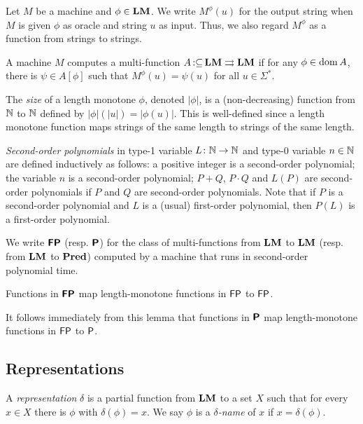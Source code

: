 \documentclass[envcountsame,orivec,oribibl]{llncs}
\newcommand{\pcolon}{\mathpunct{\,:\subseteq}}
\begin{document}
Let $M$ be a machine and $\phi \in \mathbf{LM}$. 
We write $M ^\phi (u)$ for the output string 
when $M$ is given
$\phi$ as oracle and string $u$ as input.
Thus, we also regard $M^\phi$ as a function from strings to strings.

\begin{definition}
 A machine $M$ computes a multi-function $A \pcolon \LM \rightrightarrows \LM$ if for any
 $\phi \in \mathop{\rm dom} A$, there is $\psi \in A[\phi]$ such that $M^\phi(u) = \psi(u)$ for all $u \in \Sigma^*$.
\end{definition}

The \emph{size} of a length monotone $\phi$, denoted $|\phi|$,
is a (non-decreasing) function from $\mathbb N$ to $\mathbb N$ defined by 
$|\phi|(|u|) = |\phi(u)|$.
This is well-defined since a length monotone function maps 
strings of the same length to strings of the same length.

\emph{Second-order polynomials} in type-1 variable $L \colon \mathbb N \to \mathbb N$
and type-0 variable $n \in \mathbb N$ 
are defined inductively as follows:
a positive integer is a second-order polynomial;
the variable $n$ is a second-order polynomial;
$P+Q$, $P \cdot Q$ and $L(P)$ are
second-order polynomials if $P$ and $Q$ are second-order polynomials.
Note that if $P$ is a second-order polynomial and $L$ is a (usual) first-order
polynomial, then $P(L)$ is a first-order polynomial.

\begin{definition}
 We write $\text{\bfseries \sffamily \upshape FP}$ (resp. $\text{\bfseries \sffamily \upshape P}$) for the class of
 multi-functions from $\mathbf{LM}$ to $\mathbf{LM}$ (resp. from $\mathbf{LM}$ to $\mathbf{Pred}$) 
 computed by a machine that runs
 in second-order polynomial time.
\end{definition}

\begin{lemma}
 Functions in $\text{\bfseries \sffamily \upshape FP}$ map 
 length-monotone functions in $\mathsf{FP}$ to $\mathsf{FP}$.
\end{lemma}

It follows immediately from this lemma that functions in $\text{\bfseries \sffamily \upshape P}$ map 
 length-monotone functions in $\mathsf{FP}$ to $\mathsf{P}$.


\subsection{Representations}

A {\em representation} $\delta$ is a partial function from $\mathbf{LM}$ to a set $X$
such that for every $x \in X$ there is $\phi$ with $\delta (\phi) = x$.
We say $\phi$ is a {\em $\delta$-name} of $x$
if $x = \delta(\phi)$.
\end{document}
